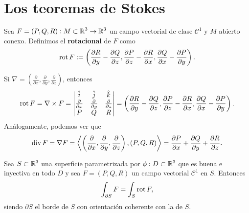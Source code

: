 \section{Los teoremas de Stokes}
\begin{definition}
Sea $\displaystyle F = \left(P,Q,R\right) : M\subset \mathbb{R}^{3}\to \mathbb{R}^{3} $ un campo vectorial de clase $\displaystyle \mathcal{C}^{1} $ y $\displaystyle M $ abierto conexo. Definimos el \textbf{rotacional} de $\displaystyle F $ como 
\[\operatorname{rot} F :=\left(\frac{\partial R}{\partial y}-\frac{\partial Q}{\partial z}, \frac{\partial P}{\partial z}-\frac{\partial R}{\partial x}, \frac{\partial Q}{\partial x}-\frac{\partial P}{\partial y}\right) .\]
\end{definition}
\begin{observation}
Si $\displaystyle \nabla = \left(\frac{\partial }{\partial x}, \frac{\partial }{\partial y}, \frac{\partial }{\partial z}\right) $, entonces
\[\operatorname{rot} F = \nabla \times F = \begin{vmatrix} \hat{i} & \hat{ j} & \hat{k} \\ \frac{\partial }{\partial x} & \frac{\partial }{\partial y} & \frac{\partial }{\partial z} \\ P & Q & R \end{vmatrix}= \left(\frac{\partial R}{\partial y}-\frac{\partial Q}{\partial z}, \frac{\partial P}{\partial z}-\frac{\partial R}{\partial x}, \frac{\partial Q}{\partial x}-\frac{\partial P}{\partial y}\right)  .\]
Análogamente, podemos ver que 
\[\operatorname{div} F = \nabla F = \left\langle \left(\frac{\partial }{\partial x}, \frac{\partial }{\partial y}, \frac{\partial}{\partial z}\right), \left(P, Q, R\right) \right\rangle  = \frac{\partial P}{\partial x}+\frac{\partial Q}{\partial y} + \frac{\partial R}{\partial z}.\]
\end{observation}
\begin{theorem}
Sea $\displaystyle S \subset \mathbb{R}^{3} $ una superficie parametrizada por $\displaystyle \phi: D \subset \mathbb{R}^{3} $ que es buena e inyectiva en todo $\displaystyle D $ y sea $\displaystyle F = \left(P, Q, R\right) $ un campo vectorial $\displaystyle \mathcal{C}^{1} $ en $\displaystyle S $. Entonces
\[\int _{\partial S}F =\int _{S}\operatorname{rot} F ,\]
siendo $\displaystyle \partial S $ el borde de $\displaystyle S $ con orientación coherente con la de $\displaystyle S $. 
\end{theorem}
